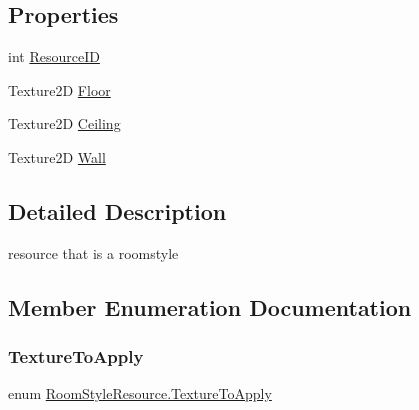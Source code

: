\subsection*{Properties}
\begin{DoxyCompactItemize}
\item 
int \mbox{\hyperlink{class_room_style_resource_a113194d661027fdac0a956cdf19dc166}{Resource\+ID}}
\item 
Texture2D \mbox{\hyperlink{class_room_style_resource_a9bb9edda92402b8e4889a168dfa13d6a}{Floor}}
\item 
Texture2D \mbox{\hyperlink{class_room_style_resource_ab07f5729c88a8a7229e1e625ef859d38}{Ceiling}}
\item 
Texture2D \mbox{\hyperlink{class_room_style_resource_a7e7f15cc941b23c889b3ff8f1b05e732}{Wall}}
\end{DoxyCompactItemize}


\subsection{Detailed Description}
resource that is a roomstyle 



\subsection{Member Enumeration Documentation}
\mbox{\label{class_room_style_resource_a877062d3830671f8376cc30340cdb45f}} 
\subsubsection{\texorpdfstring{Texture\+To\+Apply}{TextureToApply}}
{\footnotesize\ttfamily enum \mbox{\hyperlink{class_room_style_resource_a877062d3830671f8376cc30340cdb45f}{Room\+Style\+Resource.\+Texture\+To\+Apply}}\hspace{0.3cm}{\ttfamily [strong]}}

